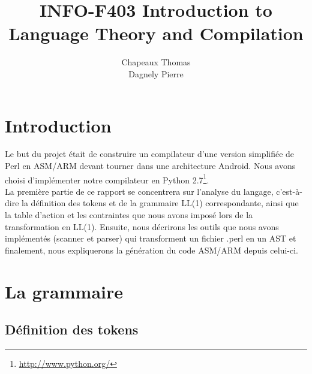 \documentclass[a4paper,10pt]{article}
\title{INFO-F403 Introduction to Language Theory and Compilation}
\author{Chapeaux Thomas\\Dagnely Pierre}
\begin{document}
\maketitle


\pagebreak


\renewcommand{\contentsname}{Table des matières}
\tableofcontents

\section{Introduction}

Le but du projet était de construire un compilateur d'une version simplifiée de Perl en ASM/ARM devant tourner dans une architecture Android. Nous avons choisi d'implémenter notre compilateur en Python 2.7\footnote{\url{http://www.python.org/}}.\\

La première partie de ce rapport se concentrera sur l'analyse du langage, c'est-à-dire la définition des tokens et de la grammaire LL(1) correspondante, ainsi que la table d'action et les contraintes que nous avons imposé lors de la transformation en LL(1). Ensuite, nous décrirons les outils que nous avons implémentés (scanner et parser) qui transforment un fichier .perl en un AST et finalement, nous expliquerons la génération du code ASM/ARM depuis celui-ci.



\section{La grammaire}

\subsection{Définition des tokens}
\end{document}
